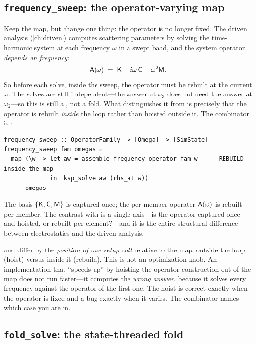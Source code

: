 \subsection{\texttt{frequency\_sweep}: the operator-varying map}

Keep the map, but change one thing: the operator is no longer fixed. The driven
analysis (\cref{ch:driven}) computes scattering parameters by solving the
time-harmonic system at each frequency $\omega$ in a swept band, and the system
operator \emph{depends on frequency}:
\[
  \mathsf{A}(\omega) \;=\; \mathsf{K} + i\omega\,\mathsf{C} - \omega^2\mathsf{M}.
\]
So before each solve, inside the sweep, the operator must be rebuilt at the current
$\omega$. The solves are still independent---the answer at $\omega_3$ does not need
the answer at $\omega_2$---so this is still a , not a fold. What
distinguishes it from  is precisely that the operator is rebuilt
\emph{inside} the loop rather than hoisted outside it. The combinator is
:
\begin{lstlisting}[style=l4style]
frequency_sweep :: OperatorFamily -> [Omega] -> [SimState]
frequency_sweep fam omegas =
  map (\w -> let aw = assemble_frequency_operator fam w   -- REBUILD inside the map
             in  ksp_solve aw (rhs_at w))
      omegas
\end{lstlisting}
The basis $\{\mathsf{K},\mathsf{C},\mathsf{M}\}$ is captured once; the per-member operator
$\mathsf{A}(\omega)$ is rebuilt per member. The contrast with  is
a single axis---is the operator captured once and hoisted, or rebuilt per
element?---and it is the entire structural difference between electrostatics and
the driven analysis.

\begin{pitfall}
 and  differ by the \emph{position of
one setup call} relative to the map: outside the loop (hoist) versus inside it
(rebuild). This is not an optimization knob. An implementation that ``speeds up''
 by hoisting the operator construction out of the map does
not run faster---it computes the \emph{wrong answer}, because it solves every
frequency against the operator of the first one. The hoist is correct exactly when
the operator is fixed and a bug exactly when it varies. The combinator names which
case you are in.
\end{pitfall}

\subsection{\texttt{fold\_solve}: the state-threaded fold}

